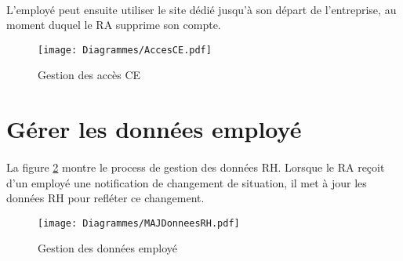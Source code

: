 \paragraph{} L'employé peut ensuite utiliser le site dédié jusqu'à son départ de l'entreprise, au moment duquel le RA supprime son compte.


\begin{figure}
	\texttt{[image: Diagrammes/AccesCE.pdf]}
	\caption{Gestion des accès CE}
	\label{accesCE}	
\end{figure}

\section{Gérer les données employé}

\paragraph{}La figure \ref{MAJDonneesRH} montre le process de gestion des données RH. Lorsque le RA reçoit d'un employé une notification de changement de situation, il met à jour les données RH pour refléter ce changement.



\begin{figure}
	\centering
	\texttt{[image: Diagrammes/MAJDonneesRH.pdf]}
	\caption{Gestion des données employé}
	\label{MAJDonneesRH}	
\end{figure}